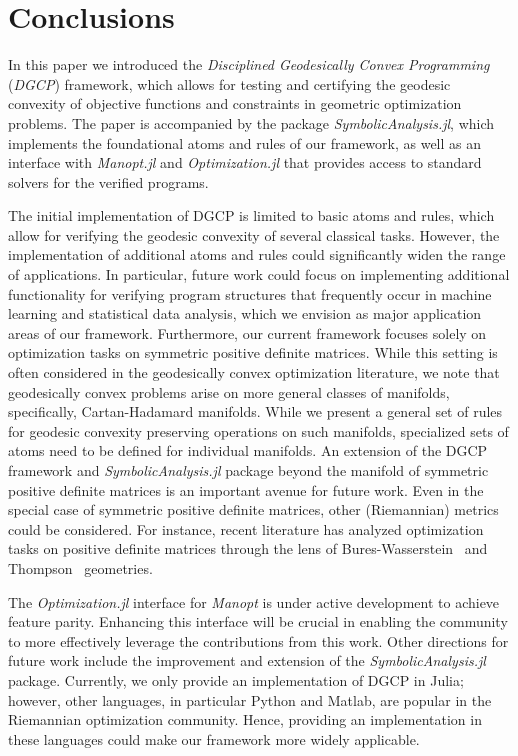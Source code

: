 \documentclass[twoside,11pt]{article}
\begin{document}
\section{Conclusions}
In this paper we introduced the \emph{Disciplined Geodesically Convex Programming} (\emph{DGCP}) framework, which allows for testing and certifying the geodesic convexity of objective functions and constraints in geometric optimization problems. The paper is accompanied by the package \textsl{SymbolicAnalysis.jl}, which implements the foundational atoms and rules of our framework, as well as an interface with \textsl{Manopt.jl} and \textsl{Optimization.jl} that provides access to standard solvers for the verified programs.

The initial implementation of DGCP is limited to basic atoms and rules, which allow for verifying the geodesic convexity of several classical tasks. However, the implementation of additional atoms and rules could significantly widen the range of applications. In particular, future work could focus on implementing additional functionality for verifying program structures that frequently occur in machine learning and statistical data analysis, which we envision as major application areas of our framework. Furthermore, our current framework focuses solely on optimization tasks on symmetric positive definite matrices. While this setting is often considered in the geodesically convex optimization literature, we note that geodesically convex problems arise on more general classes of manifolds, specifically, Cartan-Hadamard manifolds. While we present a general set of rules for geodesic convexity preserving operations on such manifolds, specialized sets of atoms need to be defined for individual manifolds. An extension of the DGCP framework and \textsl{SymbolicAnalysis.jl} package beyond the manifold of symmetric positive definite matrices is an important avenue for future work. Even in the special case of symmetric positive definite matrices, other (Riemannian) metrics could be considered. For instance, recent literature has analyzed optimization tasks on positive definite matrices through the lens of Bures-Wasserstein~\citep{chewi2020gradient} and Thompson~\citep{thompson} geometries. 

The \textsl{Optimization.jl} interface for \textsl{Manopt} is under active development to achieve feature parity. Enhancing this interface will be crucial in enabling the community to more effectively leverage the contributions from this work. Other directions for future work include the improvement and extension of the \textsl{SymbolicAnalysis.jl} package. Currently, we only provide an implementation of DGCP in Julia; however, other languages, in particular Python and Matlab, are popular in the Riemannian optimization community. Hence, providing an implementation in these languages could make our framework more widely applicable. 
\end{document}
